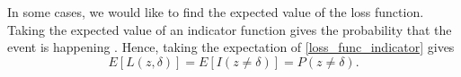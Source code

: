 \begin{comment}

se statistical decison theory for hva en loss func er. på s 109 står det om 0-1-loss. 

If the decision you make is far away from the parameter, the cost of making that decision will be high, and then we say that the loss will be big. A decision close to the parameter will give a small loss \citep{statinf}. The loss function gives the loss of making a decision. 

A commonly used loss function is the absolute error loss function. Let $\delta$ be the 
action represented as a real number, and let $\theta$ be the parameter we make decisions regarding. The absolute error loss function is then defined as
\begin{equation*}
    L(\theta,\delta) = |\theta-\delta|.
\end{equation*}
The loss is zero if $\delta=\theta$. A special case of this loss function is the 0-1-loss. Then the loss is either 0 or 1, and only two decisions can be made. Then, 
\begin{equation}
\label{loss_func_indicator}
    L(\theta,\delta) = I(\theta \neq \delta),
\end{equation}
where $I$ is an indicator function such that
\begin{equation*}
    L(\theta,\delta) =
    \begin{cases}
        0,&  \text{if } \theta = \delta, \\
        1,&  \text{if } \theta \neq \delta.
    \end{cases}
\end{equation*}
\end{comment}

In some cases, we would like to find the expected value of the loss function. Taking the expected value of an indicator function gives the probability that the event is happening \citep{algdat}. Hence, taking the expectation of \eqref{loss_func_indicator} gives
\begin{equation}
\label{expectation_of_loss_func_general}
    E[L(z,\delta)] = E[I(z\neq\delta)] = P(z\neq\delta).
\end{equation}



